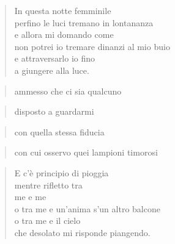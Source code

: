 
\begin{verse}
    In questa notte femminile\\
    perfino le luci tremano in lontananza\\
    e allora mi domando come\\
    non potrei io tremare dinanzi al mio buio\\
    e attraversarlo io fino\\
    a giungere alla luce.
\end{verse}
\begin{verse}
    \hfill ammesso che ci sia qualcuno
\end{verse}
\vspace{-0.9cm}
\begin{verse}
    \hfill disposto a guardarmi
\end{verse}
\vspace{-0.9cm}
\begin{verse}
    \hfill con quella stessa fiducia
\end{verse}
\vspace{-0.9cm}
\begin{verse}
    \hfill con cui osservo quei lampioni timorosi
\end{verse}
\begin{verse}
    E c'è principio di pioggia\\
    mentre rifletto tra\\
    me e me\\
    o tra me e un'anima s'un altro balcone\\
    o tra me e il cielo\\
    che desolato mi risponde piangendo.
\end{verse}